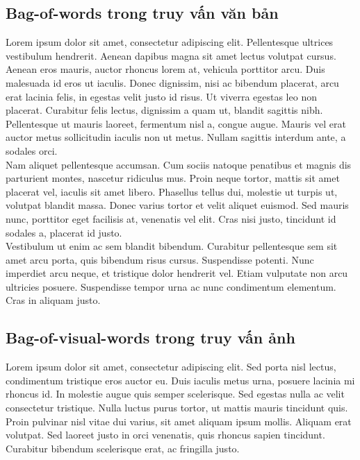 \subsection{Bag-of-words trong truy vấn văn bản}
Lorem ipsum dolor sit amet, consectetur adipiscing elit. Pellentesque ultrices vestibulum hendrerit. Aenean dapibus magna sit amet lectus volutpat cursus. Aenean eros mauris, auctor rhoncus lorem at, vehicula porttitor arcu. Duis malesuada id eros ut iaculis. Donec dignissim, nisi ac bibendum placerat, arcu erat lacinia felis, in egestas velit justo id risus. Ut viverra egestas leo non placerat. Curabitur felis lectus, dignissim a quam ut, blandit sagittis nibh. Pellentesque ut mauris laoreet, fermentum nisl a, congue augue. Mauris vel erat auctor metus sollicitudin iaculis non ut metus. Nullam sagittis interdum ante, a sodales orci.\\

Nam aliquet pellentesque accumsan. Cum sociis natoque penatibus et magnis dis parturient montes, nascetur ridiculus mus. Proin neque tortor, mattis sit amet placerat vel, iaculis sit amet libero. Phasellus tellus dui, molestie ut turpis ut, volutpat blandit massa. Donec varius tortor et velit aliquet euismod. Sed mauris nunc, porttitor eget facilisis at, venenatis vel elit. Cras nisi justo, tincidunt id sodales a, placerat id justo.\\

Vestibulum ut enim ac sem blandit bibendum. Curabitur pellentesque sem sit amet arcu porta, quis bibendum risus cursus. Suspendisse potenti. Nunc imperdiet arcu neque, et tristique dolor hendrerit vel. Etiam vulputate non arcu ultricies posuere. Suspendisse tempor urna ac nunc condimentum elementum. Cras in aliquam justo.\\

\subsection{Bag-of-visual-words trong truy vấn ảnh}
Lorem ipsum dolor sit amet, consectetur adipiscing elit. Sed porta nisl lectus, condimentum tristique eros auctor eu. Duis iaculis metus urna, posuere lacinia mi rhoncus id. In molestie augue quis semper scelerisque. Sed egestas nulla ac velit consectetur tristique. Nulla luctus purus tortor, ut mattis mauris tincidunt quis. Proin pulvinar nisl vitae dui varius, sit amet aliquam ipsum mollis. Aliquam erat volutpat. Sed laoreet justo in orci venenatis, quis rhoncus sapien tincidunt. Curabitur bibendum scelerisque erat, ac fringilla justo.\\
